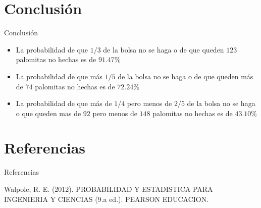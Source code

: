 \documentclass[11pt]{beamer}
\begin{document}
	
	\section{Conclusión}
			\begin{frame}{Conclusión}
				\begin{itemize}
					\item La probabilidad de que $ 1/3 $ de la bolsa no se haga o de que queden $ 123 $ palomitas no hechas es de $ 91.47\% $
     				\item La probabilidad de que más $ 1/5 $ de la bolsa no se haga o de que queden más de $ 74 $ palomitas no hechas es de $ 72.24\% $
         				\item La probabilidad de que más de $ 1/4 $ pero menos de $ 2/5 $ de la bolsa no se haga o que queden mas de $ 92 $ pero menos de $ 148 $ palomitas no hechas es de $ 43.10\% $
				\end{itemize}
			\end{frame}


	\section{Referencias}
		\begin{frame}{Referencias}
			\centering
			\begin{thebibliography}{10}
				 Walpole, R. E. (2012). PROBABILIDAD Y ESTADISTICA PARA INGENIERIA Y CIENCIAS (9.a ed.). PEARSON EDUCACION.
			\end{thebibliography}
		\end{frame}
\end{document}

